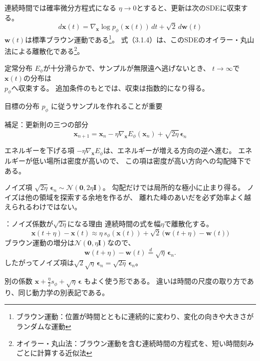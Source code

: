 \begin{frame}{連続時間では確率微分方程式になる}
    $\eta\to 0$とすると、更新は次のSDEに収束する。
    \[
        d\bm{x}(t)
        =
        \nabla_{\bm{x}}\log p_\phi(\bm{x}(t))\,dt
        +
        \sqrt{2}\,d\bm{w}(t)
        \tag{3.1.6}
\]
    $\bm{w}(t)$は標準ブラウン運動である\footnote{ブラウン運動：位置が時間とともに連続的に変わり、変化の向きや大きさがランダムな運動}。
    式（3.1.4）は、このSDEのオイラー・丸山法による離散化である\footnote{オイラー・丸山法：ブラウン運動を含む連続時間の方程式を、短い時間刻みごとに計算する近似法}。
    \begin{block}{定常分布}
        $E_\phi$が十分滑らかで、サンプルが無限遠へ逃げないとき、
        $t\to\infty$で$\bm{x}(t)$の分布は\\$p_\phi$へ収束する。
        追加条件のもとでは、収束は指数的になり得る。
    \end{block}
    目標の分布 \(p_\phi\) に従うサンプルを作れることが重要
\end{frame}
\assuppl
\begin{frame}{補足：更新則の三つの部分}
    \[
        \bm{x}_{n+1}
        =
        \bm{x}_n
        -\eta\nabla_{\bm{x}}E_\phi(\bm{x}_n)
        +\sqrt{2\eta}\,\bm{\epsilon}_n
        \tag{3.1.4}
\]
    \begin{exampleblock}{エネルギーを下げる項}
        $-\eta\nabla_{\bm{x}}E_\phi$は、エネルギーが増える方向の逆へ進む。
        エネルギーが低い場所は密度が高いので、
        この項は密度が高い方向への勾配降下である。
    \end{exampleblock}
    \begin{exampleblock}{ノイズ項}
        $\sqrt{2\eta}\,\bm{\epsilon}_n\sim\mathcal{N}(\bm{0},2\eta\bm{I})$。
        勾配だけでは局所的な極小に止まり得る。
        ノイズは他の領域を探索する余地を作るが、
        離れた峰のあいだを必ず効率よく越えられるわけではない。
    \end{exampleblock}
\end{frame}
\assuppl
\begin{frame}{\supplmark：ノイズ係数が$\sqrt{2\eta}$になる理由}
    連続時間の式を幅$\eta$で離散化する。
    \[
        \bm{x}(t+\eta)-\bm{x}(t)
        \approx
        \eta\,s_\phi(\bm{x}(t))
        +
        \sqrt{2}\,\bigl(\bm{w}(t+\eta)-\bm{w}(t)\bigr)
\]
    ブラウン運動の増分は$\mathcal{N}(\bm{0},\eta\bm{I})$なので、
    \[
        \bm{w}(t+\eta)-\bm{w}(t)
        \overset{d}{=}
        \sqrt{\eta}\,\bm{\epsilon}_n.
\]
    したがってノイズ項は$\sqrt{2}\sqrt{\eta}\,\bm{\epsilon}_n=\sqrt{2\eta}\,\bm{\epsilon}_n$。
    \begin{exampleblock}{別の係数}
        $\bm{x}+\frac{\eta}{2}s_\phi+\sqrt{\eta}\,\bm{\epsilon}$
        もよく使う形である。
        違いは時間の尺度の取り方であり、同じ動力学の別表記である。
    \end{exampleblock}
\end{frame}
